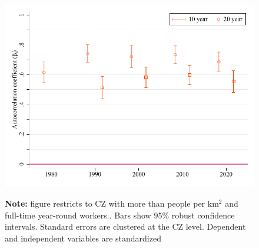 \begin{figure}[!h]
\centering
\includegraphics[width=.6\textwidth]{../2_analysis/output/figures/cz_gender_gap_persistence_full_time}
\par \begin{minipage}[h]{\textwidth}{\scriptsize\textbf{Note:} figure restricts to CZ with more than people per km$^2$ and full-time year-round workers.. Bars show 95\% robust confidence intervals. Standard errors are clustered at the CZ level. Dependent and independent variables are standardized}\end{minipage}
\end{figure}
